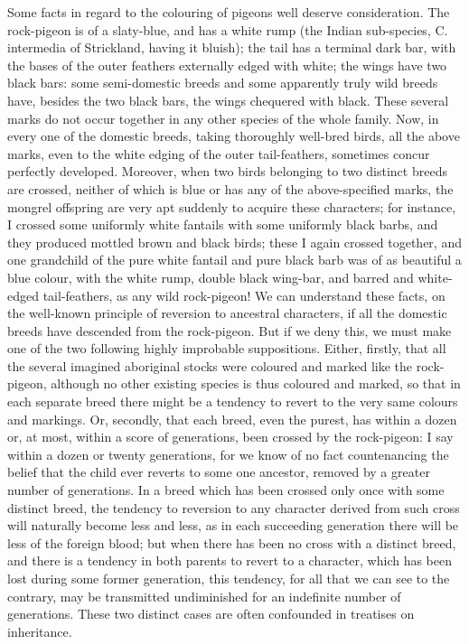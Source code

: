 \indent Some facts in regard to the colouring of pigeons well deserve consideration. The rock-pigeon is of a slaty-blue, and has a white rump (the Indian sub-species, C. intermedia of Strickland, having it bluish); the tail has a terminal dark bar, with the bases of the outer feathers externally edged with white; the wings have two black bars: some semi-domestic breeds and some apparently truly wild breeds have, besides the two black bars, the wings chequered with black.  These several marks do not occur together in any other species of the whole family. Now, in every one of the domestic breeds, taking thoroughly well-bred birds, all the above marks, even to the white edging of the outer tail-feathers, sometimes concur perfectly developed. Moreover, when two birds belonging to two distinct breeds are crossed, neither of which is blue or has any of the above-specified marks, the mongrel offspring are very apt suddenly to acquire these characters; for instance, I crossed some uniformly white fantails with some uniformly black barbs, and they produced mottled brown and black birds; these I again crossed together, and one grandchild of the pure white fantail and pure black barb was of as beautiful a blue colour, with the white rump, double black wing-bar, and barred and white-edged tail-feathers, as any wild rock-pigeon! We can understand these facts, on the well-known principle of reversion to ancestral characters, if all the domestic breeds have descended from the rock-pigeon. But if we deny this, we must make one of the two following highly improbable suppositions. Either, firstly, that all the several imagined aboriginal stocks were coloured and marked like the rock-pigeon, although no other existing species is thus coloured and marked, so that in each separate breed there might be a tendency to revert to the very same colours and markings.  Or, secondly, that each breed, even the purest, has within a dozen or, at most, within a score of generations, been crossed by the rock-pigeon: I say within a dozen or twenty generations, for we know of no fact countenancing the belief that the child ever reverts to some one ancestor, removed by a greater number of generations. In a breed which has been crossed only once with some distinct breed, the tendency to reversion to any character derived from such cross will naturally become less and less, as in each succeeding generation there will be less of the foreign blood; but when there has been no cross with a distinct breed, and there is a tendency in both parents to revert to a character, which has been lost during some former generation, this tendency, for all that we can see to the contrary, may be transmitted undiminished for an indefinite number of generations. These two distinct cases are often confounded in treatises on inheritance.   \\
